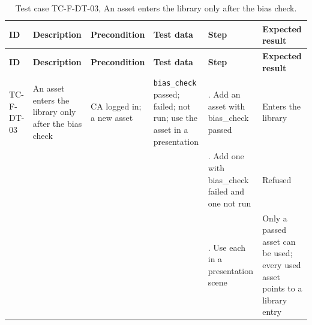 {\footnotesize{}\renewcommand{\arraystretch}{1.1}
\begin{longtable}{|>{\raggedright\arraybackslash}p{}|>{\raggedright\arraybackslash}p{}|>{\raggedright\arraybackslash}p{}|>{\raggedright\arraybackslash}p{}|>{\raggedright\arraybackslash}p{}|>{\raggedright\arraybackslash}p{}|}
\caption{Test case TC-F-DT-03, An asset enters the library only after the bias check.} \\
\hline
\textbf{ID} & \textbf{Description} & \textbf{Precondition} & \textbf{Test data} & \textbf{Step} & \textbf{Expected result} \\ \hline
\endfirsthead
\hline
\textbf{ID} & \textbf{Description} & \textbf{Precondition} & \textbf{Test data} & \textbf{Step} & \textbf{Expected result} \\ \hline
\endhead
TC-F-DT-03 & An asset enters the library only after the bias check & CA logged in; a new asset & \texttt{bias\_\allowbreak{}check} passed; failed; not run; use the asset in a presentation & 1. Add an asset with bias\_check passed & Enters the library \\ \cline{5-6}
 &  &  &  & 2. Add one with bias\_check failed and one not run & Refused \\ \cline{5-6}
 &  &  &  & 3. Use each in a presentation scene & Only a passed asset can be used; every used asset points to a library entry \\ \hline
\end{longtable}
}

